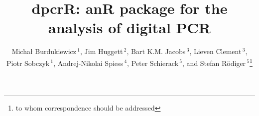 \documentclass{bioinfo}
\begin{document}

\title[dpcR]{dpcrR: an\textbf{R} package for the analysis of digital PCR}
\author[Burdukiewicz \textit{et~al.}]{Micha\l{} Burdukiewicz\,$^{1}$, Jim Huggett\,$^2$, Bart K.M. Jacobs\,$^3$, Lieven Clement\,$^3$, Piotr Sobczyk\,$^{1}$, Andrej-Nikolai Spiess\,$^4$, Peter Schierack\,$^5$, and Stefan R\"odiger\,$^{5}$\footnote{to whom correspondence should be addressed}}
\address{$^{1}$Department of Genomics, Faculty of Biotechnology, University of 
Wroc\l{}aw, Wroc\l{}aw, Poland\\
$^{2}$Molecular and Cell Biology Team, LGC, Teddington, United Kingdom\\
$^{3}$Department of Applied Mathematics, Computer Science and Statistics, Ghent University, Belgium\\
$^{4}$University Medical Center Hamburg-Eppendorf, Hamburg, Germany\\
$^{5}$Faculty of Natural Sciences, Brandenburg University of Technology 
Cottbus--Senftenberg, Germany}



\maketitle
\end{document}
